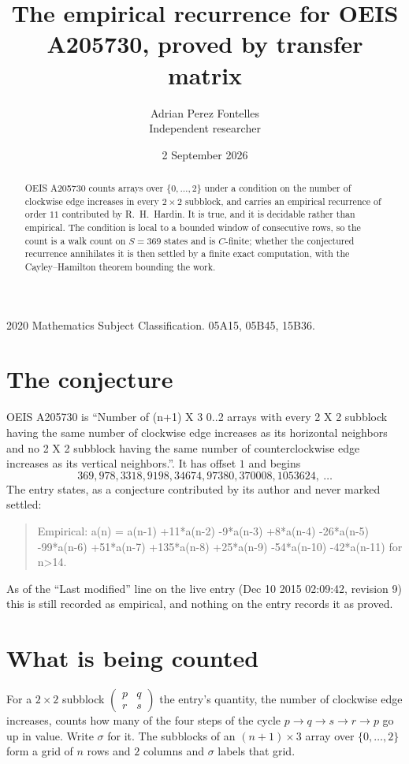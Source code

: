 \documentclass[11pt,a4paper]{article}
\title{The empirical recurrence for OEIS A205730, proved by transfer matrix}
\author{Adrian Perez Fontelles\\ \small Independent researcher}
\date{2 September 2026}
\theoremstyle{plain}
\theoremstyle{definition}
\begin{document}
\maketitle

\begin{abstract}
OEIS A205730 counts arrays over $\{0,\dots,2\}$ under a condition on the number of clockwise edge increases
in every $2\times2$ subblock, and carries an empirical recurrence of order $11$ contributed by
R.~H.~Hardin. It is true, and it is decidable rather than empirical. The condition is local to
a bounded window of consecutive rows, so the count is a walk count on $S=369$ states and is
$C$-finite; whether the conjectured recurrence annihilates it is then settled by a finite exact
computation, with the Cayley--Hamilton theorem bounding the work.
\end{abstract}

\noindent\small 2020 Mathematics Subject Classification. 05A15, 05B45, 15B36.\normalsize

\section{The conjecture}

OEIS A205730 is ``Number of (n+1) X 3 0..2 arrays with every 2 X 2 subblock having the same number of clockwise edge increases as its horizontal neighbors and no 2 X 2 subblock having the same number of counterclockwise edge increases as its vertical neighbors.''. It has offset $1$ and begins
\[
369, 978, 3318, 9198, 34674, 97380, 370008, 1053624,\ \dots
\]
The entry states, as a conjecture contributed by its author and never marked settled:
\begin{quote}
Empirical: a(n) = a(n-1) +11*a(n-2) -9*a(n-3) +8*a(n-4) -26*a(n-5) -99*a(n-6) +51*a(n-7) +135*a(n-8) +25*a(n-9) -54*a(n-10) -42*a(n-11) for n>14.
\end{quote}
As of the ``Last modified'' line on the live entry (Dec 10 2015 02:09:42, revision 9) this is still
recorded as empirical, and nothing on the entry records it as proved.

\section{What is being counted}

For a $2\times2$ subblock $\begin{pmatrix}p&q\\r&s\end{pmatrix}$ the
entry's quantity, the number of clockwise edge increases, counts how many of the four steps of the cycle $p\to q\to s\to r\to p$ go up in value. Write $\sigma$ for it. The subblocks of an
$(n+1)\times3$ array over $\{0,\dots,2\}$ form a grid of $n$ rows and $2$
columns and $\sigma$ labels that grid.
\end{document}
